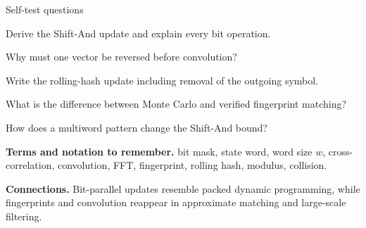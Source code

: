 \documentclass[11pt,letterpaper]{article}
\begin{document}
\begin{CornellExamBox}{Self-test questions}
\begin{CornellRecallList}
  \item Derive the Shift-And update and explain every bit operation.
  \item Why must one vector be reversed before convolution?
  \item Write the rolling-hash update including removal of the outgoing symbol.
  \item What is the difference between Monte Carlo and verified fingerprint matching?
  \item How does a multiword pattern change the Shift-And bound?
\end{CornellRecallList}
\end{CornellExamBox}

{\footnotesize
\textbf{Terms and notation to remember.} bit mask, state word, word size $w$, cross-correlation, convolution, FFT, fingerprint, rolling hash, modulus, collision.

\textbf{Connections.} Bit-parallel updates resemble packed dynamic programming, while fingerprints and convolution reappear in approximate matching and large-scale filtering.
}
\end{document}

